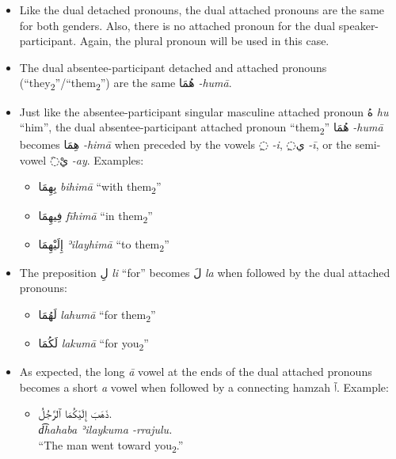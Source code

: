 \documentclass[
  10pt,
]{book}
\providecommand{\tightlist}{%
  \setlength{\itemsep}{0pt}\setlength{\parskip}{0pt}}
\begin{document}
\begin{itemize}
\item
  Like the dual detached pronouns, the dual attached pronouns are the same for both genders. Also, there is no attached pronoun for the dual speaker-participant. Again, the plural pronoun will be used in this case.
\item
  The dual absentee-participant detached and attached pronouns (\enquote{they\textsubscript{2}}/\enquote{them\textsubscript{2}}) are the same \foreignlanguage{arabic}{هُمَا} \emph{-humā}.
\item
  Just like the absentee-participant singular masculine attached pronoun \foreignlanguage{arabic}{هُ} \emph{hu} \enquote{him}, the dual absentee-participant attached pronoun \enquote{them\textsubscript{2}} \foreignlanguage{arabic}{هُمَا} \emph{-humā} becomes \foreignlanguage{arabic}{هِمَا} \emph{-himā} when preceded by the vowels \foreignlanguage{arabic}{◌ِ} \emph{-i}, \foreignlanguage{arabic}{◌ِي} \emph{-ī}, or the semi-vowel \foreignlanguage{arabic}{◌َيْ} \emph{-ay}. Examples:

  \begin{itemize}
  \tightlist
  \item
    \foreignlanguage{arabic}{بِهِمَا} \emph{bihimā} \enquote{with them\textsubscript{2}}
  \item
    \foreignlanguage{arabic}{فِيهِمَا} \emph{fīhimā} \enquote{in them\textsubscript{2}}
  \item
    \foreignlanguage{arabic}{إِلَيْهِمَا} \emph{ʾilayhimā} \enquote{to them\textsubscript{2}}
  \end{itemize}
\item
  The preposition \foreignlanguage{arabic}{لِ} \emph{li} \enquote{for} becomes \foreignlanguage{arabic}{لَ} \emph{la} when followed by the dual attached pronouns:

  \begin{itemize}
  \tightlist
  \item
    \foreignlanguage{arabic}{لَهُمَا} \emph{lahumā} \enquote{for them\textsubscript{2}}
  \item
    \foreignlanguage{arabic}{لَکُمَا} \emph{lakumā} \enquote{for you\textsubscript{2}}
  \end{itemize}
\item
  As expected, the long \emph{ā} vowel at the ends of the dual attached pronouns becomes a short \emph{a} vowel when followed by a connecting hamzah \foreignlanguage{arabic}{ٱ}. Example:

  \begin{itemize}
  \tightlist
  \item
    \foreignlanguage{arabic}{ذَهَبَ إِلَيْکُمَا ٱلرَّجُلُ.}\\
    \emph{d͡hahaba ʾilaykuma -rrajulu.}\\
    \enquote{The man went toward you\textsubscript{2}.}
  \end{itemize}
\end{itemize}
\end{document}
